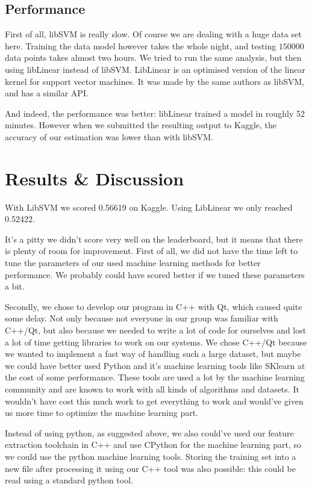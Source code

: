 \documentclass[a4paper]{jmlr}
\begin{document}
\subsection{Performance}
First of all, libSVM is really slow. Of course we are dealing with a huge data set here. Training the data model however takes the whole night, and testing $150000$ data points takes almost two hours. We tried to run the same analysis, but then using libLinear instead of libSVM. LibLinear is an optimised version of the linear kernel for support vector machines. It was made by the same authors as libSVM, and has a similar API.

And indeed, the performance was better: libLinear trained a model in roughly 52 minutes. However when we submitted the resulting output to Kaggle, the accuracy of our estimation was lower than with libSVM.


\section{Results \& Discussion}
With LibSVM we scored 0.56619 on Kaggle. Using LibLinear we only reached 0.52422.

\vspace{1em}

It's a pitty we didn't score very well on the leaderboard, but it means that there is plenty of room for improvement. First of all, we did not have the time left to tune the parameters of our used machine learning methods for better performance. We probably could have scored better if we tuned these parameters a bit.

Secondly, we chose to develop our program in C++ with Qt, which caused quite some delay. Not only because not everyone in our group was familiar with C++/Qt, but also because we needed to write a lot of code for ourselves and lost a lot of time getting libraries to work on our systems. We chose C++/Qt because we wanted to implement a fast way of handling such a large dataset, but maybe we could have better used Python and it's machine learning tools like SKlearn at the cost of some performance. These tools are used a lot by the machine learning community and are known to work with all kinds of algorithms and datasets. It wouldn't have cost this much work to get everything to work and would've given us more time to optimize the machine learning part.

Instead of using python, as suggested above, we also could've used our feature extraction toolchain in C++ and use CPython for the machine learning part, so we could use the python machine learning tools. Storing the training set into a new file after processing it using our C++ tool was also possible: this could be read using a standard python tool.
\end{document}
